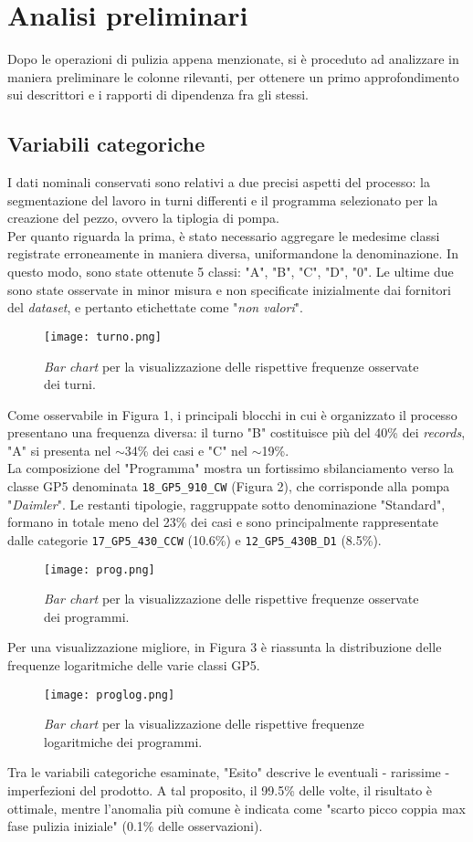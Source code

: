 \documentclass[fleqn,10pt]{SelfArx} %
\begin{document}
\section{Analisi preliminari}
Dopo le operazioni di pulizia appena menzionate, si è proceduto ad analizzare in maniera preliminare le colonne rilevanti, per ottenere un primo approfondimento sui descrittori e i rapporti di dipendenza fra gli stessi. 
\subsection{Variabili categoriche}
I dati nominali conservati sono relativi a due precisi aspetti del processo: la segmentazione del lavoro in turni differenti e il programma selezionato per la creazione del pezzo, ovvero la tiplogia di pompa.\\
Per quanto riguarda la prima, è stato necessario aggregare le medesime classi registrate erroneamente in maniera diversa, uniformandone la denominazione. In questo modo, sono state ottenute 5 classi: "A", "B", "C", "D", "0". Le ultime due sono state osservate in minor misura e non specificate inizialmente dai fornitori del \textit{dataset}, e pertanto etichettate come "\textit{non valori}".
\begin{figure}[ht]
    \centering
    \texttt{[image: turno.png]}
    \label{fig:em}
    \caption{\textit{Bar chart} per la visualizzazione delle rispettive frequenze osservate dei turni.}
\end{figure}
Come osservabile in Figura 1, i principali blocchi in cui è organizzato il processo presentano una frequenza diversa: il turno "B" costituisce più del 40\% dei \textit{records}, "A" si presenta nel $\sim$34\% dei casi e "C" nel $\sim$19\%.\\
La composizione del "Programma" mostra un fortissimo sbilanciamento verso la classe GP5 denominata \texttt{18\_GP5\_910\_CW} (Figura 2), che corrisponde alla pompa "\textit{Daimler}". Le restanti tipologie, raggruppate sotto denominazione "Standard", formano in totale meno del 23\% dei casi e sono principalmente rappresentate dalle categorie \texttt{17\_GP5\_430\_CCW} (10.6\%) e \texttt{12\_GP5\_430B\_D1} (8.5\%).
\begin{figure}[ht]
    \centering
    \texttt{[image: prog.png]}
    \label{fig:em}
    \caption{\textit{Bar chart} per la visualizzazione delle rispettive frequenze osservate dei programmi.}
\end{figure}
Per una visualizzazione migliore, in Figura 3 è riassunta la distribuzione delle frequenze logaritmiche delle varie classi GP5.
\begin{figure}[ht]
    \centering
    \texttt{[image: proglog.png]}
    \label{fig:em}
    \caption{\textit{Bar chart} per la visualizzazione delle rispettive frequenze logaritmiche dei programmi.}
\end{figure}
Tra le variabili categoriche esaminate, "Esito" descrive le eventuali - rarissime - imperfezioni del prodotto. A tal proposito, il 99.5\% delle volte, il risultato è ottimale, mentre l'anomalia più comune è indicata come "scarto picco coppia max fase pulizia iniziale" (0.1\% delle osservazioni).
\end{document}
